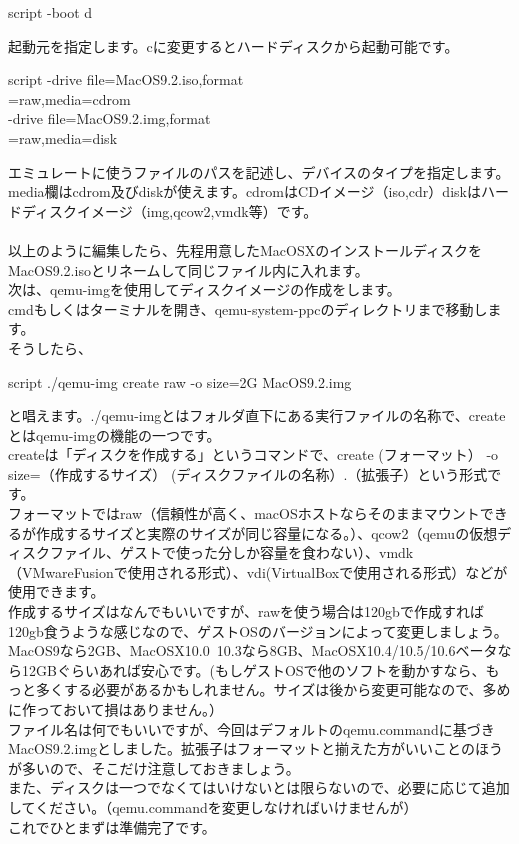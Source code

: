 \documentclass[b5paper,9pt,platex,dvipdfmx]{jsarticle}
\begin{document}
\begin{multicols*}{3}
\begin{itembox}{script}
-boot d
\end{itembox}
起動元を指定します。cに変更するとハードディスクから起動可能です。\\
\begin{itembox}{script}
-drive file=MacOS9.2.iso,format\\
=raw,media=cdrom \ \\
-drive file=MacOS9.2.img,format\\
=raw,media=disk 
\end{itembox}
エミュレートに使うファイルのパスを記述し、デバイスのタイプを指定します。\\
media欄はcdrom及びdiskが使えます。cdromはCDイメージ（iso,cdr）diskはハードディスクイメージ（img,qcow2,vmdk等）です。\\
\\
以上のように編集したら、先程用意したMacOSXのインストールディスクをMacOS9.2.isoとリネームして同じファイル内に入れます。\\
次は、qemu-imgを使用してディスクイメージの作成をします。\\
cmdもしくはターミナルを開き、qemu-system-ppcのディレクトリまで移動します。\\
そうしたら、
\begin{itembox}{script}
./qemu-img create raw -o size=2G MacOS9.2.img
\end{itembox}
と唱えます。./qemu-imgとはフォルダ直下にある実行ファイルの名称で、createとはqemu-imgの機能の一つです。\\
createは「ディスクを作成する」というコマンドで、create (フォーマット） -o size=（作成するサイズ） (ディスクファイルの名称）.（拡張子）という形式です。\\
フォーマットではraw（信頼性が高く、macOSホストならそのままマウントできるが作成するサイズと実際のサイズが同じ容量になる。）、qcow2（qemuの仮想ディスクファイル、ゲストで使った分しか容量を食わない）、vmdk（VMwareFusionで使用される形式）、vdi(VirtualBoxで使用される形式）などが使用できます。\\
作成するサイズはなんでもいいですが、rawを使う場合は120gbで作成すれば120gb食うような感じなので、ゲストOSのバージョンによって変更しましょう。\\
MacOS9なら2GB、MacOSX10.0~10.3なら8GB、MacOSX10.4/10.5/10.6ベータなら12GBぐらいあれば安心です。(もしゲストOSで他のソフトを動かすなら、もっと多くする必要があるかもしれません。サイズは後から変更可能なので、多めに作っておいて損はありません。）\\
ファイル名は何でもいいですが、今回はデフォルトのqemu.commandに基づきMacOS9.2.imgとしました。拡張子はフォーマットと揃えた方がいいことのほうが多いので、そこだけ注意しておきましょう。\\
また、ディスクは一つでなくてはいけないとは限らないので、必要に応じて追加してください。（qemu.commandを変更しなければいけませんが）\\
これでひとまずは準備完了です。\\

\end{multicols*}
\end{document}
